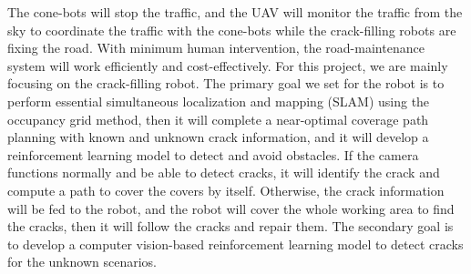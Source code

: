 \documentclass{article}
\begin{document}
The cone-bots will stop the traffic, and the UAV will monitor the traffic from the sky to coordinate the traffic with the cone-bots while the crack-filling robots are fixing the road. With minimum human intervention, the road-maintenance system will work efficiently and cost-effectively. For this project, we are mainly focusing on the crack-filling robot. The primary goal we set for the robot is to perform essential simultaneous localization and mapping (SLAM) using the occupancy grid method, then it will complete a near-optimal coverage path planning with known and unknown crack information, and it will develop a reinforcement learning model to detect and avoid obstacles. If the camera functions normally and be able to detect cracks, it will identify the crack and compute a path to cover the covers by itself. Otherwise, the crack information will be fed to the robot, and the robot will cover the whole working area to find the cracks, then it will follow the cracks and repair them. The secondary goal is to develop a computer vision-based reinforcement learning model to detect cracks for the unknown scenarios. \par





\end{document}
